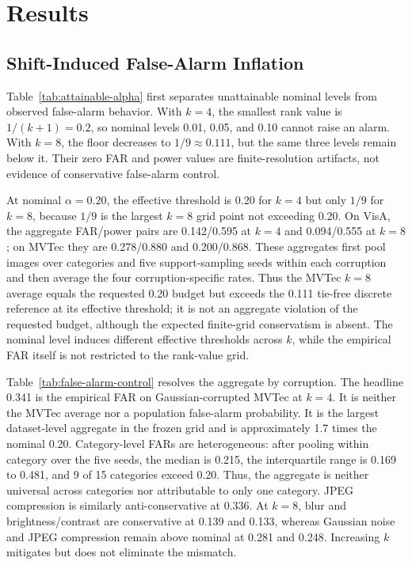 \section{Results}\label{sec:results}

\subsection{Shift-Induced False-Alarm Inflation}\label{sec:target-only-operation}



Table~\ref{tab:attainable-alpha} first separates unattainable nominal levels from observed false-alarm behavior. With $k=4$, the smallest rank value is $1/(k+1)=0.2$, so nominal levels 0.01, 0.05, and 0.10 cannot raise an alarm. With $k=8$, the floor decreases to $1/9\approx0.111$, but the same three levels remain below it. Their zero FAR and power values are finite-resolution artifacts, not evidence of conservative false-alarm control.

At nominal $\alpha=0.20$, the effective threshold is 0.20 for $k=4$ but only $1/9$ for $k=8$, because $1/9$ is the largest $k=8$ grid point not exceeding 0.20. On VisA, the aggregate FAR/power pairs are 0.142/0.595 at $k=4$ and 0.094/0.555 at $k=8$; on MVTec they are 0.278/0.880 and 0.200/0.868. These aggregates first pool images over categories and five support-sampling seeds within each corruption and then average the four corruption-specific rates. Thus the MVTec $k=8$ average equals the requested 0.20 budget but exceeds the 0.111 tie-free discrete reference at its effective threshold; it is not an aggregate violation of the requested budget, although the expected finite-grid conservatism is absent. The nominal level induces different effective thresholds across $k$, while the empirical FAR itself is not restricted to the rank-value grid.

Table~\ref{tab:false-alarm-control} resolves the aggregate by corruption. The headline 0.341 is the empirical FAR on Gaussian-corrupted MVTec at $k=4$. It is neither the MVTec average nor a population false-alarm probability. It is the largest dataset-level aggregate in the frozen grid and is approximately 1.7 times the nominal 0.20. Category-level FARs are heterogeneous: after pooling within category over the five seeds, the median is 0.215, the interquartile range is 0.169 to 0.481, and 9 of 15 categories exceed 0.20. Thus, the aggregate is neither universal across categories nor attributable to only one category. JPEG compression is similarly anti-conservative at 0.336. At $k=8$, blur and brightness/contrast are conservative at 0.139 and 0.133, whereas Gaussian noise and JPEG compression remain above nominal at 0.281 and 0.248. Increasing $k$ mitigates but does not eliminate the mismatch.

